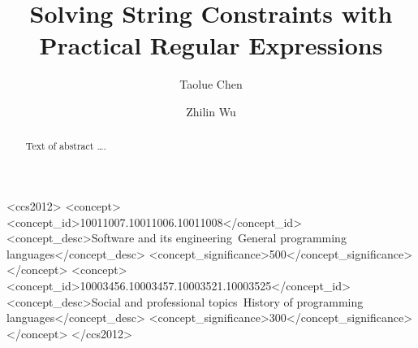 \documentclass[sigplan,review,anonymous]{acmart}\settopmatter{printfolios=true,printccs=false,printacmref=false}
\begin{document}
\title{Solving String Constraints with Practical Regular Expressions}



\author{Taolue Chen}

\author{Zhilin Wu}


\begin{abstract}
Text of abstract \ldots.
\end{abstract}


\begin{CCSXML}
<ccs2012>
<concept>
<concept_id>10011007.10011006.10011008</concept_id>
<concept_desc>Software and its engineering~General programming languages</concept_desc>
<concept_significance>500</concept_significance>
</concept>
<concept>
<concept_id>10003456.10003457.10003521.10003525</concept_id>
<concept_desc>Social and professional topics~History of programming languages</concept_desc>
<concept_significance>300</concept_significance>
</concept>
</ccs2012>
\end{CCSXML}
\end{document}
